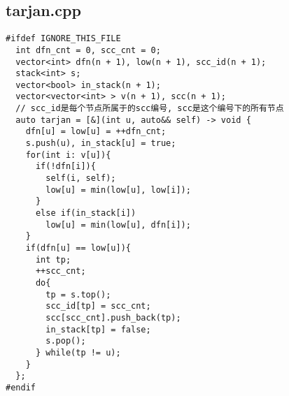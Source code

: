 \documentclass[UTF8, a4paper, titlepage, twoside]{ctexart}
\begin{document}
\subsection{tarjan.cpp}
\begin{verbatim}
#ifdef IGNORE_THIS_FILE
  int dfn_cnt = 0, scc_cnt = 0;
  vector<int> dfn(n + 1), low(n + 1), scc_id(n + 1); 
  stack<int> s;
  vector<bool> in_stack(n + 1);
  vector<vector<int> > v(n + 1), scc(n + 1);
  // scc_id是每个节点所属于的scc编号, scc是这个编号下的所有节点
  auto tarjan = [&](int u, auto&& self) -> void {
    dfn[u] = low[u] = ++dfn_cnt;
    s.push(u), in_stack[u] = true;
    for(int i: v[u]){
      if(!dfn[i]){
        self(i, self);
        low[u] = min(low[u], low[i]);
      }
      else if(in_stack[i])
        low[u] = min(low[u], dfn[i]);
    }
    if(dfn[u] == low[u]){
      int tp;
      ++scc_cnt;
      do{
        tp = s.top();
        scc_id[tp] = scc_cnt;
        scc[scc_cnt].push_back(tp);
        in_stack[tp] = false;
        s.pop();
      } while(tp != u);
    }
  };
#endif
\end{verbatim}
\end{document}
